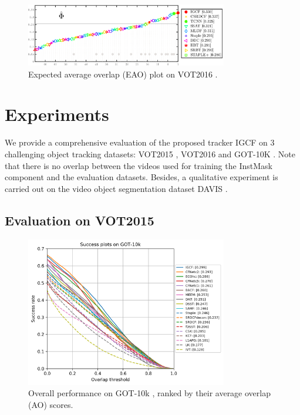 \documentclass[review]{elsarticle}
\begin{document}
\begin{figure}
    \centering
    \includegraphics[width=8.8cm]{images/vot/eao_rank_vot2016.png}
    \caption{Expected average overlap (EAO) plot on VOT2016 \cite{Kristan2016TheVO}.}
    \label{fig:vot16}
\end{figure}

\section{Experiments}
We provide a comprehensive evaluation of the proposed tracker IGCF on 3 challenging object tracking datasets: VOT2015 \cite{Kristan2015TheVO}, VOT2016 \cite{Kristan2016TheVO} and GOT-10K \cite{Huang2018GOT10kAL}. Note that there is no overlap between the videos used for training the InstMask component and the evaluation datasets. Besides, a qualitative experiment is carried out on the video object segmentation dataset DAVIS \cite{Perazzi2016}.
\subsection{Evaluation on VOT2015}

\begin{figure}
    \centering
    \includegraphics[width=8.8cm]{images/got10k/success_plot.png}
    \caption{Overall performance on GOT-10k \cite{Huang2018GOT10kAL}, ranked by their average overlap (AO) scores.}
    \label{fig:got10k}
\end{figure}
\end{document}
